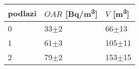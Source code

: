\begin{tabular}{lll}
\toprule
podlazi & $OAR$ [\si{Bq/m^3}] & $V$ [\si{m^3}] \\
\midrule
0 &              33$\pm$2 &        66$\pm$13 \\
1 &              61$\pm$3 &       105$\pm$11 \\
2 &              79$\pm$2 &       153$\pm$15 \\
\bottomrule
\end{tabular}
